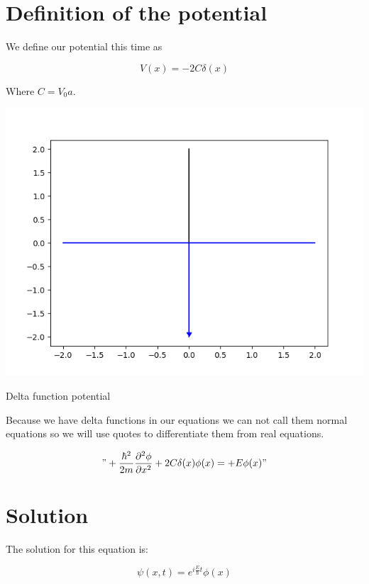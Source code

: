 \section{Definition of the potential}

We define our potential this time as

\begin{equation}
    \label{4.1}
    V(x) = -2C\delta(x)
\end{equation}

Where $C= V_0a$.

\begin{marginfigure}
  \includegraphics{images4/delta.png}
  \caption{Delta function potential}
  \label{figure4-1}
\end{marginfigure}

Because we have delta functions in our equations we can not call them normal equations so we will use quotes to differentiate them from real equations.

\begin{equation}
    "+\frac{\hbar^2}{2m}\frac{\partial^2\phi}{\partial x^2} + 2C\delta(x) \phi(x) = + E \phi(x)"
\end{equation}

\section{Solution}

The solution for this equation is:

\begin{equation}
    \label{4.3}
    \psi(x,t) = e^{i\frac{E}{\hbar}t} \phi(x)
\end{equation}

